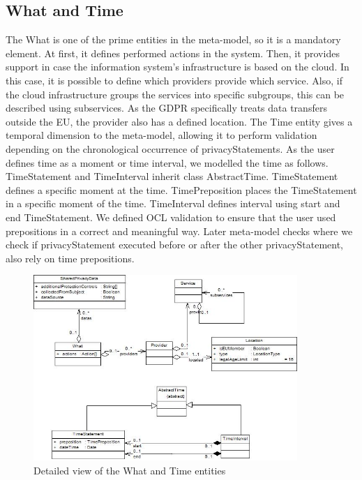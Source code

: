 \documentclass[11pt,english]{article}
\begin{document}
\subsection{What and Time}
The What is one of the prime entities in the meta-model, so it is a mandatory element. At first, it defines performed actions in the system. Then, it provides support in case the information system's infrastructure is based on the cloud. In this case, it is possible to define which providers provide which service. Also, if the cloud infrastructure groups the services into specific subgroups, this can be described using subservices. As the GDPR specifically treats data transfers outside the EU, the provider also has a defined location. \newline The Time entity gives a temporal dimension to the meta-model, allowing it to perform validation depending on the chronological occurrence of privacyStatements. As the user defines time as a moment or time interval, we modelled the time as follows. TimeStatement and TimeInterval inherit class AbstractTime. TimeStatement defines a specific moment at the time. TimePreposition places the TimeStatement in a specific moment of the time. TimeInterval defines interval using start and end TimeStatement. We defined OCL validation to ensure that the user used prepositions in a correct and meaningful way. Later meta-model checks where we check if privacyStatement executed before or after the other privacyStatement, also rely on time prepositions.
\begin{figure}[H]
    \centering
    \includegraphics[width=10cm,scale=0.5]{images/whatAndTime.jpg}
    \caption{Detailed view of the What and Time entities}
    \label{fig:WhatAndTime}
\end{figure}
\end{document}
